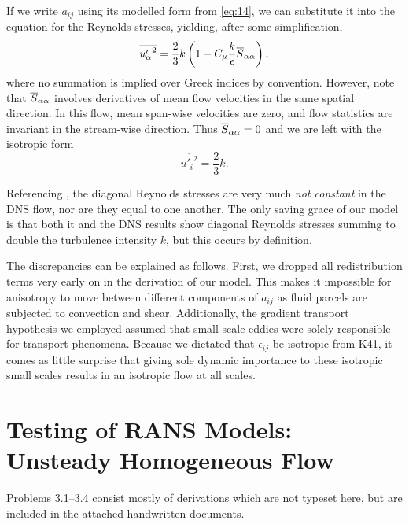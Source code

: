 \documentclass[11pt]{article}
\begin{document}
If we write $a_{ij}$ using its modelled form from \eqref{eq:14}, we can substitute it into the equation for the Reynolds stresses, yielding, after some simplification,
\begin{equation}
\overline{{u'_\alpha}^2} =
\frac{2}{3}k
\left(
1 - C_\mu \frac{k}{\epsilon} \overline{S}_{\alpha \alpha}
\right)
,
\end{equation}
where no summation is implied over Greek indices by convention. However, note that $\overline{S}_{\alpha\alpha}$ involves derivatives of mean flow velocities in the same spatial direction. In this flow, mean span-wise velocities are zero, and flow statistics are invariant in the stream-wise direction. Thus $\overline{S}_{\alpha\alpha} = 0$ and we are left with the isotropic form
\begin{equation}
\overline{{u'_i}^2} = \frac{2}{3} k
.
\end{equation}

Referencing , the diagonal Reynolds stresses are very much \emph{not constant} in the DNS flow, nor are they equal to one another. The only saving grace of our model is that both it and the DNS results show diagonal Reynolds stresses summing to double the turbulence intensity $k$, but this occurs by definition.

The discrepancies can be explained as follows. First, we dropped all redistribution terms very early on in the derivation of our model. This makes it impossible for anisotropy to move between different components of $a_{ij}$ as fluid parcels are subjected to convection and shear. Additionally, the gradient transport hypothesis we employed assumed that small scale eddies were solely responsible for transport phenomena. Because we dictated that $\epsilon_{ij}$ be isotropic from K41, it comes as little surprise that giving sole dynamic importance to these isotropic small scales results in an isotropic flow at all scales.

\subsection{}

\section{Testing of RANS Models: Unsteady Homogeneous Flow}

Problems 3.1--3.4 consist mostly of derivations which are not typeset here, but are included in the attached handwritten documents.
\setcounter{subsection}{4}
\end{document}
